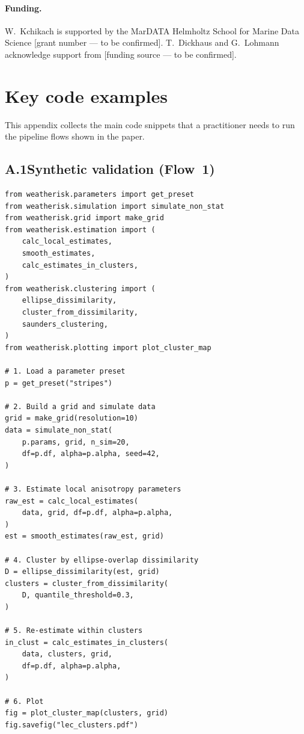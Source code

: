 \documentclass[preprint,12pt,a4paper]{elsarticle}
\begin{document}
\paragraph*{Funding.}
W.~Kchikach is supported by the MarDATA Helmholtz School for Marine
Data Science [grant number --- to be confirmed]. T.~Dickhaus and
G.~Lohmann acknowledge support from [funding source --- to be confirmed].

\appendix

\section{Key code examples}
\label{app:code}

This appendix collects the main code snippets that a practitioner
needs to run the pipeline flows shown in the paper.

\subsection{A.1\quad Synthetic validation (Flow~1)}

\begin{lstlisting}[caption={Complete synthetic validation
  workflow.}, label=lst:app-validate]
from weatherisk.parameters import get_preset
from weatherisk.simulation import simulate_non_stat
from weatherisk.grid import make_grid
from weatherisk.estimation import (
    calc_local_estimates,
    smooth_estimates,
    calc_estimates_in_clusters,
)
from weatherisk.clustering import (
    ellipse_dissimilarity,
    cluster_from_dissimilarity,
    saunders_clustering,
)
from weatherisk.plotting import plot_cluster_map

# 1. Load a parameter preset
p = get_preset("stripes")

# 2. Build a grid and simulate data
grid = make_grid(resolution=10)
data = simulate_non_stat(
    p.params, grid, n_sim=20,
    df=p.df, alpha=p.alpha, seed=42,
)

# 3. Estimate local anisotropy parameters
raw_est = calc_local_estimates(
    data, grid, df=p.df, alpha=p.alpha,
)
est = smooth_estimates(raw_est, grid)

# 4. Cluster by ellipse-overlap dissimilarity
D = ellipse_dissimilarity(est, grid)
clusters = cluster_from_dissimilarity(
    D, quantile_threshold=0.3,
)

# 5. Re-estimate within clusters
in_clust = calc_estimates_in_clusters(
    data, clusters, grid,
    df=p.df, alpha=p.alpha,
)

# 6. Plot
fig = plot_cluster_map(clusters, grid)
fig.savefig("lec_clusters.pdf")
\end{lstlisting}
\end{document}
